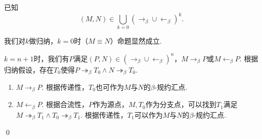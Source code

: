 \begin{pf} \rm 已知
$$
(M, N) \in \bigcup_{k=0} (\rightarrow_\beta\cup \leftarrow_\beta)^k.
$$

我们对$k$做归纳，$k=0$时（$M\equiv N$）命题显然成立.

$k=n+1$时，我们有$P$满足$(P, N)\in(\rightarrow_\beta\cup \leftarrow_\beta)^{n}$，$M\rightarrow_\beta P$或$ M\leftarrow_\beta P$. 根据归纳假设，存在$T_0$使得$P\twoheadrightarrow_\beta T_0\wedge N\twoheadrightarrow_\beta T_0$.
\begin{enumerate}
    \item $M\rightarrow_\beta P$.  根据传递性，$T_0$也可作为$M$与$N$的$\beta$-规约汇点.
    \item $M\leftarrow_\beta P$. 根据合流性，$P$作为源点，$M, T_0$作为分支点，可以找到$T_1$满足$M\twoheadrightarrow_\beta T_1\wedge T_0\twoheadrightarrow_\beta T_1$. 根据传递性，$T_1$可以作为$M$与$N$的$\beta$-规约汇点.
\end{enumerate}


    \qed 
\end{pf}